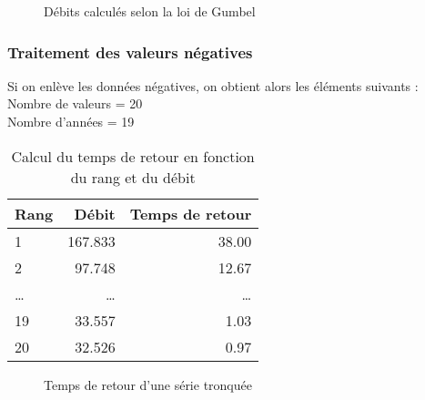 \begin{figure}[H]
    \centering
    \caption{Débits calculés selon la loi de Gumbel}
    \label{graph:debits_gumbel_tronquee}
\end{figure}

\subsubsection{Traitement des valeurs négatives}
Si on enlève les données négatives, on obtient alors les éléments suivants :
Nombre de valeurs = 20 \\
Nombre d'années = 19
\begin{multicols}{2}
    \begin{table}[H]
        \centering
        \begin{tabular}{l|r|r}
            \hline
            \textbf{Rang} & \textbf{Débit} & \textbf{Temps de retour} \\
            \hline
            1             & 167.833        & 38.00                    \\
            2             & 97.748         & 12.67                    \\
            \dots         & \dots          & \dots                    \\
            19            & 33.557         & 1.03                    \\
            20            & 32.526         & 0.97                     \\
            \hline
        \end{tabular}
        \caption{Calcul du temps de retour en fonction du rang et du débit}
        \label{tab:serieTronquee2_tempsRetour}
    \end{table}

    \columnbreak

    \begin{figure}[H]
        \centering
        \resizebox*{0.45\textwidth}{!}{
            
        }
        \caption{Temps de retour d'une série tronquée}
        \label{graph:tempsRetour2_serieTronquee}
    \end{figure}
\end{multicols}

